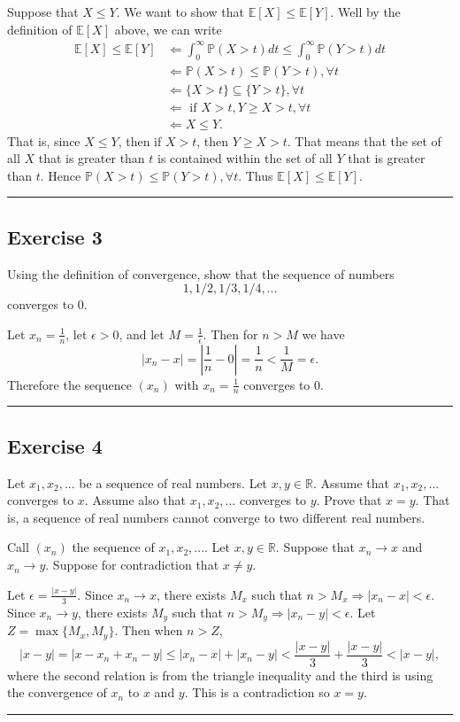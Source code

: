 \documentclass{article}
\theoremstyle{break}
\newenvironment{solution}{{\bf Solution:}}{\hfill\rule{2mm}{2mm}}
\renewenvironment{proof}{{\bf Proof:}}{\hfill\rule{2mm}{2mm}}
\newcommand{\E}{\mathbb{E}}
\newcommand{\R}{\mathbb{R}}
\renewcommand{\P}{\mathbb{P}}
\begin{document}
\begin{solution}
Suppose that $X \leq Y$. We want to show that $\E[X] \leq \E[Y]$. Well by the definition of $\E[X]$ above, we can write
\begin{align*}
\E[X] \leq \E[Y] &\Leftarrow \int_0^\infty \P(X > t) dt \leq \int_0^\infty \P(Y > t) dt \\
	&\Leftarrow \P(X > t) \leq \P(Y > t), \forall t \\
	&\Leftarrow \{ X > t \} \subseteq \{ Y > t \}, \forall t \\
	&\Leftarrow \text{ if } X > t, Y \geq X > t, \forall t \\
	&\Leftarrow X \leq Y.
\end{align*}
That is, since $X \leq Y$, then if $X > t$, then $Y \geq X > t$. That means that the set of all $X$ that is greater than $t$ is contained within the set of all $Y$ that is greater than $t$. Hence $\P(X > t) \leq \P(Y > t), \forall t$. Thus $\E[X] \leq \E[Y]$.

\end{solution}

\subsection*{Exercise 3}
Using the definition of convergence, show that the sequence of numbers 
\[ 1, 1/2, 1/3, 1/4, ... \]
converges to 0. 

\begin{proof}
Let $x_n = \frac{1}{n}$, let $\epsilon > 0$, and let $M = \frac{1}{\epsilon}$. Then for $n > M$ we have 
\[ |x_n - x| = \left| \frac{1}{n} - 0 \right| = \frac{1}{n} < \frac{1}{M} = \epsilon.\]
Therefore the sequence $(x_n)$ with $x_n = \frac{1}{n}$ converges to 0.
\end{proof}

\subsection*{Exercise 4}
Let $x_1, x_2, ...$ be a sequence of real numbers. Let $x,y \in \R$. Assume that $x_1, x_2, ...$ converges to $x$. Assume also that $x_1, x_2, ... $ converges to $y$. Prove that $x = y$. That is, a sequence of real numbers cannot converge to two different real numbers.

\begin{proof}
Call $(x_n)$ the sequence of $x_1, x_2, ...$. Let $x,y \in \R$. Suppose that $x_n \rightarrow x$ and $x_n \rightarrow y$. Suppose for contradiction that $x \not = y$. 

Let $\epsilon = \frac{|x-y|}{3}$. Since $x_n \rightarrow x$, there exists $M_x$ such that $n > M_x \Rightarrow |x_n - x| < \epsilon$. Since $x_n \rightarrow y$, there exists $M_y$ such that $n > M_y \Rightarrow |x_n - y| < \epsilon$. Let $Z = \max\{M_x, M_y\}$. Then when $n > Z$,
\[ |x - y| = |x - x_n + x_n - y| \leq |x_n - x| + |x_n - y| < \frac{|x-y|}{3} + \frac{|x-y|}{3} < |x - y|,
\]
where the second relation is from the triangle inequality and the third is using the convergence of $x_n$ to $x$ and $y$. This is a contradiction so $x = y$.
\end{proof}
\end{document}
